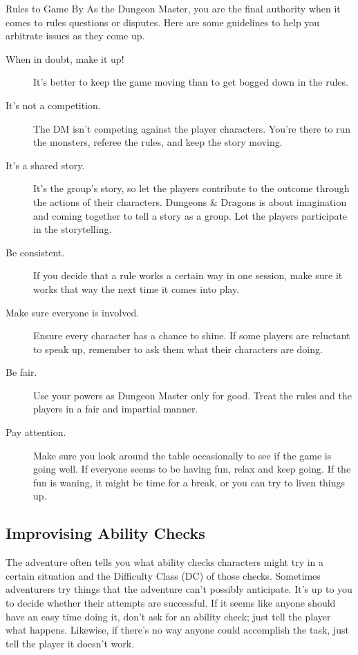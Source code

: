 \documentclass[10pt,a4paper,twoside,bg=print,twocolumn,openany,nodeprecatedcode]{dndbook}
\begin{document}
\begin{DndSidebar}[float=!b]{Rules to Game By}
As the Dungeon Master, you are the final authority when it comes to rules questions or disputes. Here are some guidelines to help you arbitrate issues as they come up.




\begin{description}
\item[When in doubt, make it up!]
It's better to keep the game moving than to get bogged down in the rules.
\item[It's not a competition.]
The DM isn't competing against the player characters. You're there to run the monsters, referee the rules, and keep the story moving.
\item[It's a shared story.]
It's the group's story, so let the players contribute to the outcome through the actions of their characters. Dungeons & Dragons is about imagination and coming together to tell a story as a group. Let the players participate in the storytelling.
\item[Be consistent.]
If you decide that a rule works a certain way in one session, make sure it works that way the next time it comes into play.
\item[Make sure everyone is involved.]
Ensure every character has a chance to shine. If some players are reluctant to speak up, remember to ask them what their characters are doing.
\item[Be fair.]
Use your powers as Dungeon Master only for good. Treat the rules and the players in a fair and impartial manner.
\item[Pay attention.]
Make sure you look around the table occasionally to see if the game is going well. If everyone seems to be having fun, relax and keep going. If the fun is waning, it might be time for a break, or you can try to liven things up.
\end{description}



\end{DndSidebar}

\subsection{Improvising Ability Checks}
The adventure often tells you what ability checks characters might try in a certain situation and the Difficulty Class (DC) of those checks. Sometimes adventurers try things that the adventure can't possibly anticipate. It's up to you to decide whether their attempts are successful. If it seems like anyone should have an easy time doing it, don't ask for an ability check; just tell the player what happens. Likewise, if there's no way anyone could accomplish the task, just tell the player it doesn't work.
\end{document}
